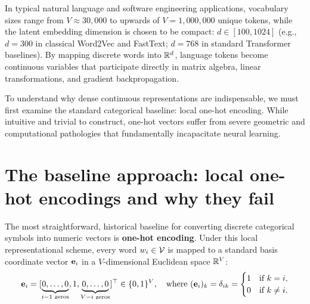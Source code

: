 \documentclass[../../main.tex]{subfiles}
\begin{document}
In typical natural language and software engineering applications, vocabulary sizes range from $V \approx 30{,}000$ to upwards of $V = 1{,}000{,}000$ unique tokens, while the latent embedding dimension is chosen to be compact: $d \in [100, 1024]$ (e.g., $d = 300$ in classical Word2Vec and FastText; $d = 768$ in standard Transformer baselines). By mapping discrete words into $\mathbb{R}^d$, language tokens become continuous variables that participate directly in matrix algebra, linear transformations, and gradient backpropagation.

To understand why dense continuous representations are indispensable, we must first examine the standard categorical baseline: local one-hot encoding. While intuitive and trivial to construct, one-hot vectors suffer from severe geometric and computational pathologies that fundamentally incapacitate neural learning.

\clearpage
\section{The baseline approach: local one-hot encodings and why they fail}
\label{sec:onehot_baseline}

The most straightforward, historical baseline for converting discrete categorical symbols into numeric vectors is \textbf{one-hot encoding}. Under this local representational scheme, every word $w_i \in \mathcal{V}$ is mapped to a standard basis coordinate vector $\mathbf{e}_i$ in a $V$-dimensional Euclidean space $\mathbb{R}^V$:
\begin{equation}
\label{eq:onehot_def}
\mathbf{e}_i = [\underbrace{0, \dots, 0}_{i-1\text{ zeros}}, 1, \underbrace{0, \dots, 0}_{V-i\text{ zeros}}]^\top \in \{0, 1\}^V, \quad \text{where } (\mathbf{e}_i)_k = \delta_{ik} = \begin{cases} 1 & \text{if } k = i, \\ 0 & \text{if } k \neq i. \end{cases}
\end{equation}
\end{document}
